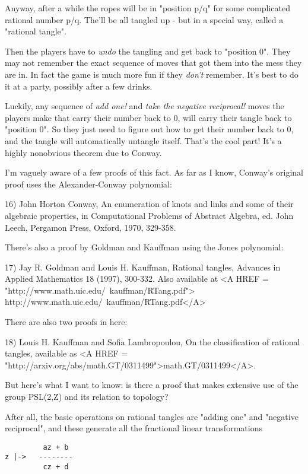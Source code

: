 Anyway, after a while the ropes will be 
in "position p/q" for some complicated rational number p/q.  
The'll be all tangled up - but in a special way, called a 
"rational tangle".

Then the players have to \emph{undo} 
the tangling and get back to "position 0".
They may not remember the exact sequence of moves that got them into
the mess they are in.  In fact the game is much more fun if they 
\emph{don't}
remember.  It's best to do it at a party, possibly after a few drinks.

Luckily, any sequence of \emph{add one!} and 
\emph{take the negative reciprocal!} moves the players
make that carry their number back to 0, will carry their tangle back 
to "position 0".  So they just need to figure out how to get their 
number back to 0, and the tangle will automatically untangle itself.  
That's the cool part!  It's a highly nonobvious theorem due to Conway.

I'm vaguely aware of a few proofs of this fact.  As far as I know, 
Conway's original proof uses the Alexander-Conway polynomial:

16) John Horton Conway, An enumeration of knots and links and some
of their algebraic properties, in Computational Problems of Abstract
Algebra, ed. John Leech, Pergamon Press, Oxford, 1970, 329-358.

There's also a proof by Goldman and Kauffman using the Jones polynomial:

17) Jay R. Goldman and Louis H. Kauffman, Rational tangles, Advances in 
Applied Mathematics 18 (1997), 300-332.  Also available at 
<A HREF = "http://www.math.uic.edu/~kauffman/RTang.pdf">
http://www.math.uic.edu/~kauffman/RTang.pdf</A>

There are also two proofs in here:

18) Louis H. Kauffman and Sofia Lambropoulou, On the classification of
rational tangles, available as 
<A HREF = "http://arxiv.org/abs/math.GT/0311499">math.GT/0311499</A>.
 
But here's what I want to know: is there a proof that makes
extensive use of the group PSL(2,Z) and its relation to topology?

After all, the basic operations on rational tangles are "adding
one" and "negative reciprocal", and these generate all the 
fractional linear transformations

\begin{verbatim}
         az + b
z |->   --------
         cz + d
\end{verbatim}
    
